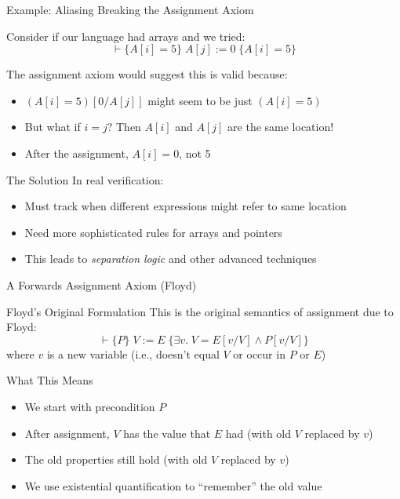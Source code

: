 \begin{frame}{Example: Aliasing Breaking the Assignment Axiom}
    \begin{example}
        Consider if our language had arrays and we tried:
        \[ \vdash \{A[i] = 5\} \; A[j] := 0 \; \{A[i] = 5\} \]
        
        The assignment axiom would suggest this is valid because:
        \begin{itemize}
            \item $(A[i] = 5)[0/A[j]]$ might seem to be just $(A[i] = 5)$
            \item But what if $i = j$? Then $A[i]$ and $A[j]$ are the same location!
            \item After the assignment, $A[i] = 0$, not 5
        \end{itemize}
    \end{example}
    
    \begin{block}{The Solution}
        In real verification:
        \begin{itemize}
            \item Must track when different expressions might refer to same location
            \item Need more sophisticated rules for arrays and pointers
            \item This leads to \emph{separation logic} and other advanced techniques
        \end{itemize}
    \end{block}
\end{frame}

\begin{frame}{A Forwards Assignment Axiom (Floyd)}
    \begin{block}{Floyd's Original Formulation}
        This is the original semantics of assignment due to Floyd:
        \[ \vdash \{P\} \; V := E \; \{\exists v. \; V = E[v/V] \wedge P[v/V]\} \]
        where $v$ is a new variable (i.e., doesn't equal $V$ or occur in $P$ or $E$)
    \end{block}
    
    \begin{block}{What This Means}
        \begin{itemize}
            \item We start with precondition $P$
            \item After assignment, $V$ has the value that $E$ had (with old $V$ replaced by $v$)
            \item The old properties still hold (with old $V$ replaced by $v$)
            \item We use existential quantification to ``remember'' the old value
        \end{itemize}
    \end{block}
\end{frame}

